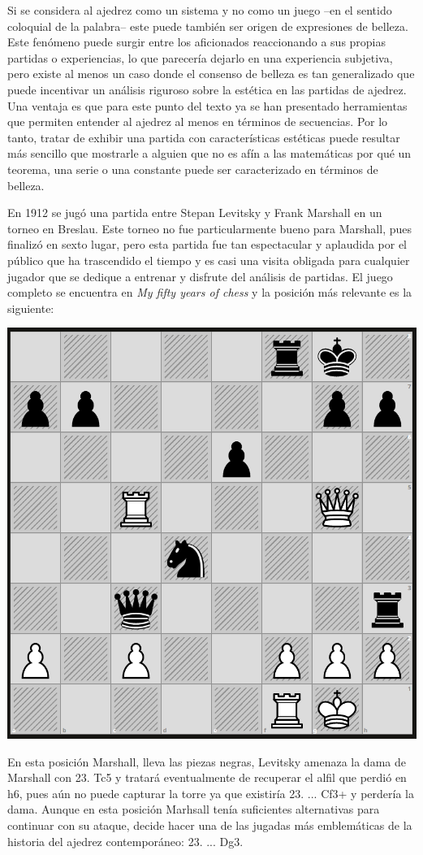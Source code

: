 \documentclass[twoside,openright,12pt,a4paper,spanish]{book}
\begin{document}
Si se considera al ajedrez como un sistema y no como un juego --en el sentido coloquial de la palabra-- este puede también ser origen de expresiones de belleza. Este fenómeno puede surgir entre los aficionados reaccionando a sus propias partidas o experiencias, lo que parecería dejarlo en una experiencia subjetiva, pero existe al menos un caso donde el consenso de belleza es tan generalizado que puede incentivar un an\'alisis riguroso sobre la est\'etica en las partidas de ajedrez. Una ventaja es que para este punto del texto ya se han presentado herramientas que permiten entender al ajedrez al menos en términos de secuencias. Por lo tanto, tratar de exhibir una partida con características estéticas puede resultar más sencillo que mostrarle a alguien que no es afín a las matemáticas por qué un teorema, una serie o una constante puede ser caracterizado en términos de belleza.

En 1912 se jug\'o una partida entre Stepan Levitsky y Frank Marshall en un torneo en Breslau. Este torneo no fue particularmente bueno para Marshall, pues finaliz\'o en sexto lugar, pero esta partida fue tan espectacular y aplaudida por el p\'ublico que ha trascendido el tiempo y es casi una visita obligada para cualquier jugador que se dedique a entrenar y disfrute del an\'alisis de partidas. El juego completo se encuentra en \textit{My fifty years of chess} \cite{marshall2002my} y la posici\'on m\'as relevante es la siguiente:

\begin{center}

    \includegraphics[width=8.0 cm,height=8.0 cm]{marshall-levitsky23.png}
    
\end{center}

En esta posici\'on Marshall, lleva las piezas negras, Levitsky amenaza la dama de Marshall con 23. Tc5 y tratar\'a eventualmente de recuperar el alfil que perdi\'o en h6, pues aún no puede capturar la torre ya que existir\'ia 23. ... Cf3+ y perder\'ia la dama. Aunque en esta posici\'on Marhsall tenía suficientes alternativas para continuar con su ataque, decide hacer una de las jugadas m\'as emblem\'aticas de la historia del ajedrez contemporáneo: 23. ... Dg3.
\end{document}
